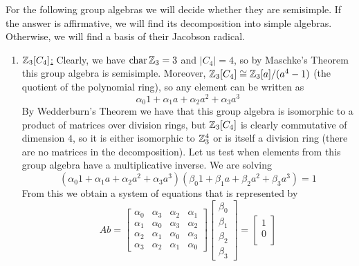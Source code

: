 \documentclass[a4paper, 12pt]{article}
\begin{document}
\begin{Exercise}
    For the following group algebras we will decide whether they are semisimple.
    If the answer is affirmative, we will find its decomposition into simple algebras.
    Otherwise, we will find a basis of their Jacobson radical.
    \begin{enumerate}[label=(\alph*)]
        \item \underline{$\mathbb{Z}_3[C_4]$:}
            Clearly, we have $\operatorname{char}\mathbb{Z}_3 = 3$ and $|C_4| = 4$,
            so by Maschke's Theorem this group algebra is semisimple.
            Moreover, $\mathbb{Z}_3[C_4] \cong \mathbb{Z}_3[a]/(a^4 - 1)$ (the quotient of the polynomial ring),
            so any element can be written as
            \[
                \alpha_0 1 + \alpha_1 a + \alpha_2 a^2 + \alpha_3 a^3
            \]
            By Wedderburn's Theorem we have that this group algebra is isomorphic to a product of matrices over division rings,
            but $\mathbb{Z}_3[C_4]$ is clearly commutative of dimension $4$,
            so it is either isomorphic to $\mathbb{Z}_3^4$ or is itself a division ring (there are no matrices in the decomposition).
            Let us test when elements from this group algebra have a multiplicative inverse.
            We are solving
            \[
                (\alpha_0 1 + \alpha_1 a + \alpha_2 a^2 + \alpha_3 a^3)(\beta_0 1 + \beta_1 a + \beta_2 a^2 + \beta_3 a^3) = 1
            \]
            From this we obtain a system of equations that is represented by
            \[
                Ab =
                \begin{bmatrix}
                    \alpha_0 & \alpha_3 & \alpha_2 & \alpha_1 \\
                    \alpha_1 & \alpha_0 & \alpha_3 & \alpha_2 \\
                    \alpha_2 & \alpha_1 & \alpha_0 & \alpha_3 \\
                    \alpha_3 & \alpha_2 & \alpha_1 & \alpha_0 
                \end{bmatrix}
                \begin{bmatrix}
                    \beta_0 \\
                    \beta_1 \\
                    \beta_2 \\
                    \beta_3
                \end{bmatrix}
                =
                \begin{bmatrix}
                    1 \\
                    0 \\

\end{bmatrix}\]
\end{enumerate}
\end{Exercise}
\end{document}
